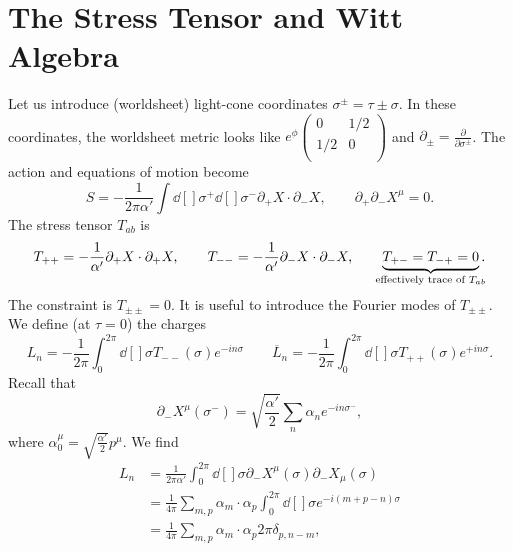\section{The Stress Tensor and Witt Algebra}%
\label{sec:the_stress_tensor_and_witt_algebra}

Let us introduce (worldsheet) light-cone coordinates $\sigma^{\pm} = \tau \pm \sigma$.
In these coordinates, the worldsheet metric looks like $e^{\phi}
\begin{pmatrix}
 0 & 1 / 2 \\
 1 / 2 & 0 \\
\end{pmatrix} $ and $\partial_{\pm} = \frac{\partial }{\partial \sigma^\pm}$.
The action and equations of motion become
\begin{equation}
  S = -\frac{1}{2 \pi \alpha'} \int \dd[]{\sigma^+} \dd[]{\sigma^-} \partial_+ X \cdot \partial_- X, \qquad \partial_+ \partial_- X^{\mu} = 0.
\end{equation}
The stress tensor $T_{ab}$  is
\begin{equation}
  T_{++} = -\frac{1}{\alpha'} \partial_+ X \cdot \partial_+ X, 
  \qquad T_{--} = -\frac{1}{\alpha'} \partial_- X \cdot \partial_- X,
  \qquad \underbrace{T_{+ - } =T_{- +} = 0}_{\mathclap{\text{effectively trace of } T_{ab}}}.
\end{equation}
The constraint is $T_{\pm \pm} = 0$. It is useful to introduce the Fourier modes of $T_{\pm \pm}$. We define (at $\tau = 0$) the charges
\begin{equation}
  L_n = -\frac{1}{2\pi} \int_0^{2\pi} \dd[]{\sigma} T_{--}(\sigma) e^{-in\sigma} \qquad
  \overline{L}_n = -\frac{1}{2\pi} \int_0^{2\pi} \dd[]{\sigma} T_{++}(\sigma) e^{+in\sigma}.
\end{equation}
Recall that 
\begin{equation}
  \partial_- X^{\mu}(\sigma^-) = \sqrt{\frac{\alpha'}{2}} \sum_n \alpha_n e^{-i n \sigma^-}, 
\end{equation}
where $\alpha_0^{\mu} = \sqrt{\frac{\alpha'}{2}} p^{\mu}$.
We find
\begin{align}
  L_n &= \frac{1}{2 \pi \alpha'} \int_{0}^{2\pi}\dd[]{\sigma}  \partial_- X^{\mu}(\sigma) \partial_- X_{\mu}(\sigma) \\
      &= \frac{1}{4 \pi} \sum_{m,  p} \alpha_m \cdot \alpha_p \int_0^{2\pi} \dd[]{\sigma} e^{-i (m + p - n) \sigma} \\
      &= \frac{1}{4 \pi} \sum_{m, p} \alpha_m \cdot \alpha_p 2 \pi \delta_{p, n-m},
\end{align}
